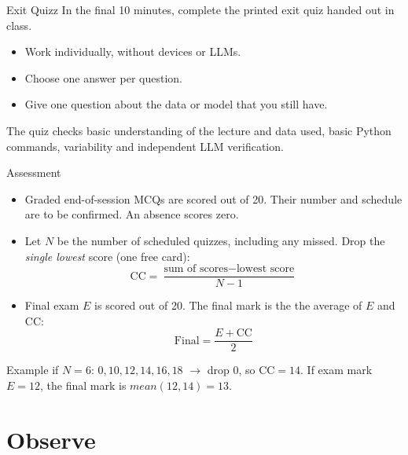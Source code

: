 \documentclass{beamer}
\begin{document}
\begin{frame}{Exit Quizz}
  \Large In the final 10 minutes, complete the printed exit quiz handed out in class.\normalsize
  \vspace{0.8em}
  \begin{itemize}
    \item Work individually, without devices or LLMs.
    \item Choose one answer per question.
    \item Give one question about the data or model that you still have.
  \end{itemize}
  \vspace{0.5em}
  The quiz checks basic understanding of the lecture and data used, basic Python commands, variability and independent LLM verification.
\end{frame}


\begin{frame}{Assessment}
  \begin{itemize}
    \item Graded end-of-session MCQs are scored out of 20. Their number and schedule are to be confirmed. An absence scores zero.
    \item Let $N$ be the number of scheduled quizzes, including any missed. Drop the \emph{single lowest} score (one free card):
  \[
    \mathrm{CC}=\frac{\text{sum of scores}-\text{lowest score}}{N-1}
  \]
  \item Final exam $E$ is scored out of 20. The final mark is the the average of $E$ and CC:
  \[
    \mathrm{Final}=\frac{E+\mathrm{CC}}{2}
  \]
  \end{itemize}
  \small
  Example if $N=6$: $0,10,12,14,16,18$ $\rightarrow$ drop $0$, so $\mathrm{CC}=14$.
  If exam mark $E=12$, the final mark is $mean(12,14)=13$.
\end{frame}

\section{Observe}
\end{document}
